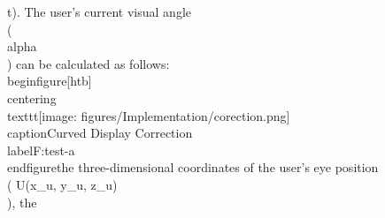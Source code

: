 t). The user's current visual angle \\( \\alpha \\) can be calculated as follows:\n\n\\begin{figure}[htb]\n    \\centering\n    \\texttt{[image: figures/Implementation/corection.png]}\n    \\caption{Curved Display Correction}\\label{F:test-a}\n\\end{figure}\n\nFrom the three-dimensional coordinates of the user's eye position \\( U(x_u, y_u, z_u) \\), the